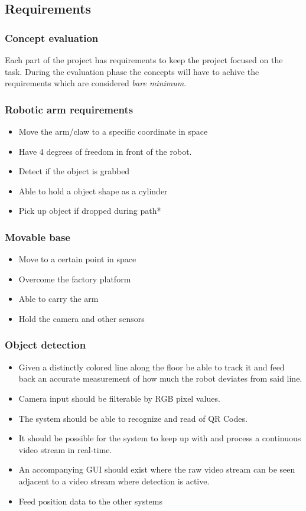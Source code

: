 \documentclass{beamer}
\begin{document}
\begin{frame}
    \subsection{Requirements}
    \frametitle{Concept evaluation}
    Each part of the project has requirements to keep the project focused 
    on the task. During the evaluation phase the concepts will have to achive
    the requirements which are considered \textit{bare minimum}. 
\end{frame}

\begin{frame}
    \frametitle{Robotic arm requirements}
    \begin{itemize}
        \item Move the arm/claw to a specific coordinate in space
        \item Have 4 degrees of freedom in front of the robot.
        \item Detect if the object is grabbed
        \item Able to hold a object shape as a cylinder
        \item Pick up object if dropped during path*
    \end{itemize}
\end{frame}

\begin{frame}
    \frametitle{Movable base}
    \begin{itemize}
        \item Move to a certain point in space
        \item Overcome the factory platform
        \item Able to carry the arm
        \item Hold the camera and other sensors
    \end{itemize}
\end{frame}

\begin{frame}
    \frametitle{Object detection}
    \begin{itemize}
        \item Given a distinctly colored line along the floor be able to track it and
        feed back an accurate measurement of how much the robot deviates from said line.
        \item Camera input should be filterable by RGB pixel values.
        \item The system should be able to recognize and read of QR Codes.
        \item It should be possible for the system to keep up with and process a continuous video stream in real-time.
        \item An accompanying GUI should exist where the raw video stream can be seen adjacent to a video stream where detection is active.
        \item Feed position data to the other systems
    \end{itemize}
\end{frame}
\end{document}
